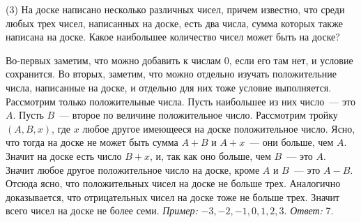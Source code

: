 \textsf{(3)}
На доске написано несколько различных чисел, причем известно, что среди любых
трех чисел, написанных на доске, есть два числа, сумма которых также написана
на доске.
Какое наибольшее количество чисел может быть на доске?

\solution
Во-первых заметим, что можно добавить к числам 0, если его там нет,
и условие сохранится.
Во вторых, заметим, что можно отдельно изучать положительние числа,
написанные на доске, и отдельно для них тоже условие выполняется.
Рассмотрим только положительные числа.
Пусть наибольшее из них число~--- это $A$.
Пусть $B$~--- второе по величине положительное число.
Рассмотрим тройку $(A, B, x)$, где $x$ любое другое имеющееся на доске
положительное число.
Ясно, что тогда на доске не может быть сумма $A + B$ и $A + x$~--- они больше,
чем $A$.
Значит на доске есть число $B + x$, и, так как оно больше, чем $B$~--- это $A$.
Значит любое другое положительное число на доске, кроме $A$ и $B$~---
это $A - B$.
Отсюда ясно, что положительных чисел на доске не больше трех.
Аналогично доказывается, что отрицательных чисел на доске тоже не больше трех.
Значит всего чисел на доске не более семи.
\emph{Пример:} $-3, -2, -1, 0, 1, 2, 3$.
\emph{Ответ:} 7.

